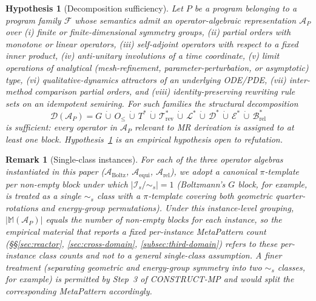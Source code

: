 \documentclass[manuscript]{acmart}
\newtheorem{hypothesis}{Hypothesis}
\newtheorem{remark}{Remark}
\begin{document}
\begin{hypothesis}[Decomposition sufficiency]
\label{hyp:seven-blocks}
Let $P$ be a program belonging to a program family $\mathcal{F}$ whose semantics admit an operator-algebraic representation $\mathcal{A}_P$ over (i) finite or finite-dimensional symmetry groups, (ii) partial orders with monotone or linear operators, (iii) self-adjoint operators with respect to a fixed inner product, (iv) anti-unitary involutions of a time coordinate, (v) limit operations of analytical (mesh-refinement, parameter-perturbation, or asymptotic) type, (vi) qualitative-dynamics attractors of an underlying ODE/PDE, (vii) inter-method comparison partial orders, and (viii) identity-preserving rewriting rule sets on an idempotent semiring. For such families the structural decomposition
$$\mathcal{D}(\mathcal{A}_P) = G \,\dot\cup\, O_{\le} \,\dot\cup\, T^{*} \,\dot\cup\, \mathcal{T}^{*}_{\mathrm{rev}} \,\dot\cup\, \mathcal{L}^{*} \,\dot\cup\, \mathcal{D}^{*} \,\dot\cup\, \mathcal{E}^{*} \,\dot\cup\, \mathcal{B}^{*}_{\mathrm{rel}}$$
is sufficient: every operator in $\mathcal{A}_P$ relevant to MR derivation is assigned to at least one block. Hypothesis~\ref{hyp:seven-blocks} is an empirical hypothesis open to refutation.
\end{hypothesis}

\begin{remark}[Single-class instances]
\label{rem:single-class-instances}
For each of the three operator algebras instantiated in this paper ($\mathcal{A}_{\mathrm{Boltz}}$, $\mathcal{A}_{\mathrm{equi}}$, $\mathcal{A}_{\mathrm{rel}}$), we adopt a canonical $\pi$-template per non-empty block under which $|\mathcal{I}_s/\sim_s|=1$ (Boltzmann's $G$ block, for example, is treated as a single $\sim_s$ class with a $\pi$-template covering both geometric quarter-rotations and energy-group permutations). Under this instance-level grouping, $|\mathbb{M}(\mathcal{A}_P)|$ equals the number of non-empty blocks for each instance, so the empirical material that reports a fixed per-instance MetaPattern count (\S\S\ref{sec:reactor}, \ref{sec:cross-domain}, \ref{subsec:third-domain}) refers to these per-instance class counts and not to a general single-class assumption. A finer treatment (separating geometric and energy-group symmetry into two $\sim_s$ classes, for example) is permitted by Step~3 of CONSTRUCT-MP and would split the corresponding MetaPattern accordingly.
\end{remark}
\end{document}
